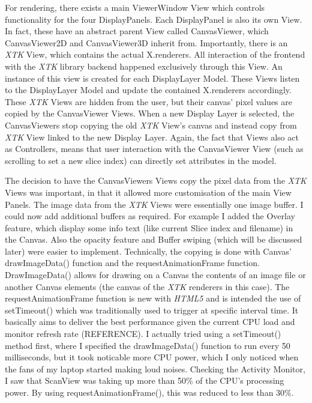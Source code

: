 \documentclass[a4paper,11pt,twoside]{article}
\begin{document}
For rendering, there exists a main ViewerWindow View which controls functionality for the four DisplayPanels. Each DisplayPanel is also its own View. In fact, these have an abstract parent View called CanvasViewer, which CanvasViewer2D and CanvasViewer3D inherit from. Importantly, there is an \textit{XTK} View, which contains the actual X.renderers. All interaction of the frontend with the \textit{XTK} library backend happened exclusively through this View. An instance of this view is created for each DisplayLayer Model. These Views listen to the DisplayLayer Model and update the contained X.renderers accordingly. These \textit{XTK} Views are hidden from the user, but their canvas' pixel values are copied by the CanvasViewer Views. When a new Display Layer is selected, the CanvasViewers stop copying the old \textit{XTK} View's canvas and instead copy from \textit{XTK} View linked to the new Display Layer. Again, the fact that Views also act as Controllers, means that user interaction with the CanvasViewer View (such as scrolling to set a new slice index) can directly set attributes in the model.


The decision to have the CanvasViewers Views copy the pixel data from the \textit{XTK} Views was important, in that it allowed more customisation of the main View Panels. The image data from the \textit{XTK} Views were essentially one image buffer. I could now add additional buffers as required. For example I added the Overlay feature, which display some info text (like current Slice index and filename) in the Canvas. Also the opacity feature and Buffer swiping (which will be discussed later) were easier to implement. Technically, the copying is done with Canvas' drawImageData() function and the requestAnimationFrame function. DrawImageData() allows for drawing on a Canvas the contents of an image file or another Canvas elements (the canvas of the \textit{XTK} renderers in this case). The requestAnimationFrame function is new with \textit{HTML5} and is intended the use of setTimeout() which was traditionally used to trigger at specific interval time. It basically aims to deliver the best performance given the current CPU load and monitor refresh rate (REFERENCE). I actually tried using a setTimeout() method first, where I specified the drawImageData() function to run every 50 milliseconds, but it took noticable more CPU power, which I only noticed when the fans of my laptop started making loud noises. Checking the Activity Monitor, I saw that ScanView was taking up more than 50\% of the CPU's processing power. By using requestAnimationFrame(), this was reduced to less than 30\%.
\end{document}

